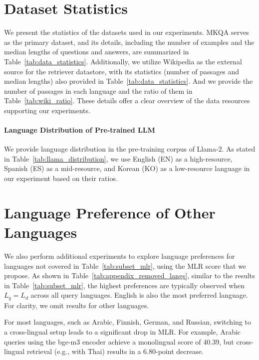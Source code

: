 \section{Dataset Statistics}

We present the statistics of the datasets used in our experiments. MKQA serves as the primary dataset, and its details, including the number of examples and the median lengths of questions and answers, are summarized in Table~\ref{tab:data_statistics}. Additionally, we utilize Wikipedia as the external source for the retriever datastore, with its statistics (number of passages and median lengths) also provided in Table~\ref{tab:data_statistics}. And we provide the number of passages in each language and the ratio of them in Table~\ref{tab:wiki_ratio}. These details offer a clear overview of the data resources supporting our experiments.

\paragraph{Language Distribution of Pre-trained LLM}
We provide language distribution in the pre-training corpus of Llama-2. As stated in Table~\ref{tab:llama_distribution}, we use English (EN) as a high-resource, Spanish (ES) as a mid-resource, and Korean (KO) as a low-resource language in our experiment based on their ratios.



\label{appendix:statistics}





\section{Language Preference of Other Languages}
We also perform additional experiments to explore language preferences for languages not covered in Table~\ref{tab:subset_mlr}, using the MLR score that we propose. As shown in Table~\ref{tab:appendix_removed_langs}, similar to the results in Table~\ref{tab:subset_mlr}, the highest preferences are typically observed when $L_q = L_d$ across all query languages. English is also the most preferred language. For clarity, we omit results for other languages.

For most languages, such as Arabic, Finnish, German, and Russian, switching to a cross-lingual setup leads to a significant drop in MLR. For example, Arabic queries using the bge-m3 encoder achieve a monolingual score of 40.39, but cross-lingual retrieval (e.g., with Thai) results in a 6.80-point decrease.

